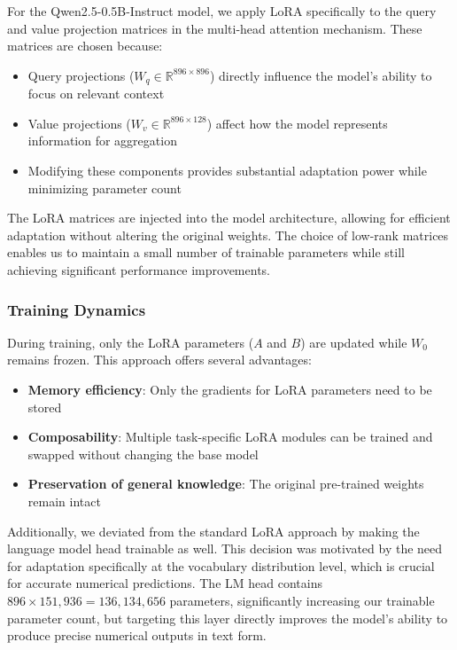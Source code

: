 \documentclass{article}
\begin{document}
    For the Qwen2.5-0.5B-Instruct model, we apply LoRA specifically to the query and value projection matrices in the multi-head attention mechanism. These matrices are chosen because:
    
    \begin{itemize}
        \item Query projections ($W_q \in \mathbb{R}^{896 \times 896}$) directly influence the model's ability to focus on relevant context
        \item Value projections ($W_v \in \mathbb{R}^{896 \times 128}$) affect how the model represents information for aggregation
        \item Modifying these components provides substantial adaptation power while minimizing parameter count
    \end{itemize}
The LoRA matrices are injected into the model architecture, allowing for efficient adaptation without altering the original weights. The choice of low-rank matrices enables us to maintain a small number of trainable parameters while still achieving significant performance improvements.
    \subsubsection*{Training Dynamics}

During training, only the LoRA parameters ($A$ and $B$) are updated while $W_0$ remains frozen. This approach offers several advantages:

\begin{itemize}
    \item \textbf{Memory efficiency}: Only the gradients for LoRA parameters need to be stored
    \item \textbf{Composability}: Multiple task-specific LoRA modules can be trained and swapped without changing the base model
    \item \textbf{Preservation of general knowledge}: The original pre-trained weights remain intact
\end{itemize}

Additionally, we deviated from the standard LoRA approach by making the language model head trainable as well. This decision was motivated by the need for adaptation specifically at the vocabulary distribution level, which is crucial for accurate numerical predictions. The LM head contains $896 \times 151,936 = 136,134,656$ parameters, significantly increasing our trainable parameter count, but targeting this layer directly improves the model's ability to produce precise numerical outputs in text form.
\end{document}
